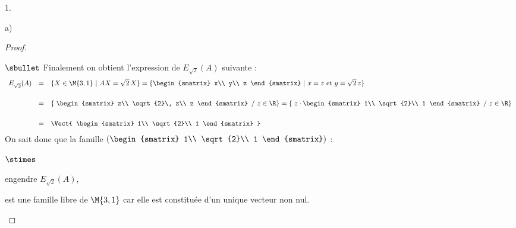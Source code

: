 \begin{noliste}{1.}
\begin{noliste}{a)}
\begin{proof}
\begin{noliste}{$\sbullet$}
	Finalement on obtient l'expression de $E_{\sqrt{2}}(A)$ 
	suivante :
	\[
	 \begin{array}{rcl}
	  E_{\sqrt{2}}(A) & = & \{X\in\M{3,1} \ | \ AX=\sqrt{2}\, X\}
	   = \{
	  \begin{smatrix}
	   x\\ y\\ z
	  \end{smatrix}
	  \ | \
	   x = z \mbox{ et }
	   y = \sqrt{2} \, z
	  \}
	  \\[.6cm]
	  & = & \left\{\right.
	  \begin{smatrix}
	   z\\ 
	   \sqrt{2}\, z\\ 
	   z
	  \end{smatrix}
	  \ \left/ \
	  z\in\R\right\}
	   = \left\{\right. z \cdot
	  \begin{smatrix}
	   1\\ 
	   \sqrt{2}\\ 
	   1
	  \end{smatrix}
	  \ \left/ \
	  z\in\R\right\}
	  \\[.6cm]
	  & = & \Vect{
	  \begin{smatrix}
	   1\\ \sqrt{2}\\ 1
	  \end{smatrix}
	  }
	 \end{array}
	\]
	On sait donc que la famille $\left( \begin{smatrix}
	   1\\ \sqrt{2}\\ 1
	  \end{smatrix}\right)$ :
	\begin{noliste}{$\stimes$}
	  \item engendre $E_{\sqrt{2}}(A)$,
	  \item est une famille libre de $\M{3,1}$ car elle est 
	  constituée d'un unique vecteur non nul.
	\end{noliste}
	
	  

\end{noliste}
\end{proof}
\end{noliste}
\end{noliste}
